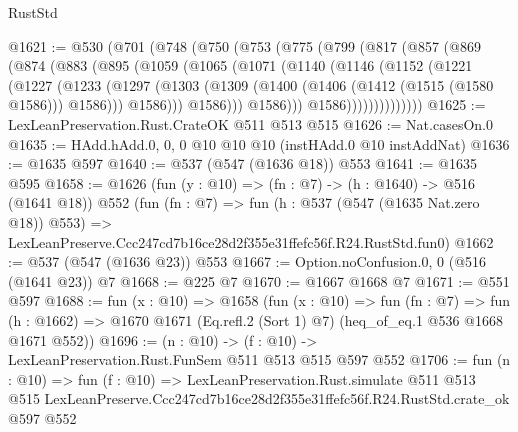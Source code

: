\begin{lexlean}{RustStd}
\begin{coremodule}
@1621 := @530
    (@701
      (@748
        (@750
          (@753
            (@775
              (@799
                (@817
                  (@857
                    (@869
                      (@874
                        (@883
                          (@895
                            (@1059
                              (@1065
                                (@1071
                                  (@1140
                                    (@1146
                                      (@1152
                                        (@1221
                                          (@1227
                                            (@1233
                                              (@1297
                                                (@1303
                                                  (@1309
                                                    (@1400
                                                      (@1406 (@1412 (@1515 (@1580 @1586))) @1586)))
                                                  @1586)))
                                            @1586)))
                                      @1586)))
                                @1586))))))))))))))
@1625 := LexLeanPreservation.Rust.CrateOK @511 @513 @515
@1626 := Nat.casesOn.{0}
@1635 := HAdd.hAdd.{0, 0, 0} @10 @10 @10 (instHAdd.{0} @10 instAddNat)
@1636 := @1635 @597
@1640 := @537 (@547 (@1636 @18)) @553
@1641 := @1635 @595
@1658 := @1626
    (fun (y : @10) => (fn : @7) -> (h : @1640) -> @516 (@1641 @18))
    @552
    (fun (fn : @7) =>
    fun (h : @537 (@547 (@1635 Nat.zero @18)) @553) =>
    LexLeanPreserve.Ccc247cd7b16ce28d2f355e31ffefc56f.R24.RustStd.fun0)
@1662 := @537 (@547 (@1636 @23)) @553
@1667 := Option.noConfusion.{0, 0} (@516 (@1641 @23)) @7
@1668 := @225 @7
@1670 := @1667 @1668 @7
@1671 := @551 @597
@1688 := fun (x : @10) =>
  @1658
    (fun (x : @10) =>
    fun (fn : @7) =>
    fun (h : @1662) => @1670 @1671 (Eq.refl.{2} (Sort 1) @7) (heq_of_eq.{1} @536 @1668 @1671 @552))
@1696 := (n : @10) -> (f : @10) -> LexLeanPreservation.Rust.FunSem @511 @513 @515 @597 @552
@1706 := fun (n : @10) =>
  fun (f : @10) =>
  LexLeanPreservation.Rust.simulate
    @511
    @513
    @515
    LexLeanPreserve.Ccc247cd7b16ce28d2f355e31ffefc56f.R24.RustStd.crate_ok
    @597
    @552
\end{coremodule}
\end{lexlean}
